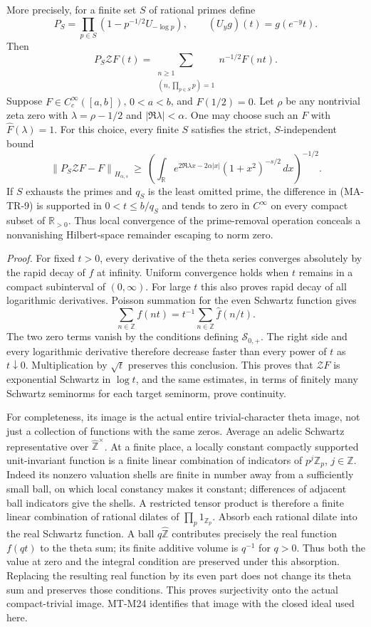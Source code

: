 More precisely, for a finite set $S$ of rational primes define
\[
 P_S=\prod_{p\in S}(1-p^{-1/2}U_{-\log p}),\qquad
 (U_y g)(t)=g(e^{-y}t).
\]
Then
\[
 P_S\mathcal ZF(t)=
       \sum_{\substack{n\ge1\\(n,\prod_{p\in S}p)=1}}
                    n^{-1/2}F(nt).
 \tag{MA-TR-8}
\]
Suppose $F\in C_c^\infty([a,b])$, $0<a<b$, and
$\widehat F(1/2)=0$. Let $\rho$ be any nontrivial zeta zero with
$\lambda=\rho-1/2$ and $|\Re\lambda|<\alpha$. One may choose such
an $F$ with $\widehat F(\lambda)=1$. For this choice, every finite
$S$ satisfies the strict, $S$-independent bound
\[
 \left\|P_S\mathcal ZF-F\right\|_{H_{\alpha,s}}
 \ \ge\
 \left(\int_{\mathbb R}
     e^{2\Re\lambda x-2\alpha|x|}(1+x^2)^{-s/2}\,dx\right)^{-1/2}.
 \tag{MA-TR-9}
\]
If $S$ exhausts the primes and $q_S$ is the least omitted prime,
the difference in (MA-TR-9) is supported in $0<t\le b/q_S$ and
tends to zero in $C^\infty$ on every compact subset of
$\mathbb R_{>0}$. Thus local convergence of the prime-removal
operation conceals a nonvanishing Hilbert-space remainder escaping
to norm zero.

\emph{Proof.}
For fixed $t>0$, every derivative of the theta series converges
absolutely by the rapid decay of $f$ at infinity. Uniform convergence
holds when $t$ remains in a compact subinterval of $(0,\infty)$.
For large $t$ this also proves rapid decay of all logarithmic
derivatives. Poisson summation for the even Schwartz function gives
\[
 \sum_{n\in\mathbb Z}f(nt)=t^{-1}
                \sum_{n\in\mathbb Z}\widehat f(n/t).
\]
The two zero terms vanish by the conditions defining
$\mathscr S_{0,+}$. The right side and every logarithmic derivative
therefore decrease faster than every power of $t$ as $t\downarrow0$.
Multiplication by $\sqrt t$ preserves this conclusion. This proves
that $\mathcal ZF$ is exponential Schwartz in $\log t$, and the same
estimates, in terms of finitely many Schwartz seminorms for each
target seminorm, prove continuity.

For completeness, its image is the actual entire trivial-character
theta image, not just a collection of functions with the same
zeros. Average an adelic Schwartz representative over
$\widehat{\mathbb Z}^{\times}$. At a finite place, a locally constant
compactly supported unit-invariant function is a finite linear
combination of indicators of $p^j\mathbb Z_p$, $j\in\mathbb Z$.
Indeed its nonzero valuation shells are finite in number away from
a sufficiently small ball, on which local constancy makes it
constant; differences of adjacent ball indicators give the shells.
A restricted tensor product is therefore a finite linear combination
of rational dilates of $\prod_p1_{\mathbb Z_p}$. Absorb each rational
dilate into the real Schwartz function. A ball $q\widehat{\mathbb Z}$
contributes precisely the real function $f(qt)$ to the theta sum;
its finite additive volume is $q^{-1}$ for $q>0$. Thus both the
value at zero and the integral condition are preserved under this
absorption. Replacing the resulting real function by its even part
does not change its theta sum and preserves those conditions.
This proves surjectivity onto the actual compact-trivial image.
MT-M24 identifies that image with the closed ideal used here.

